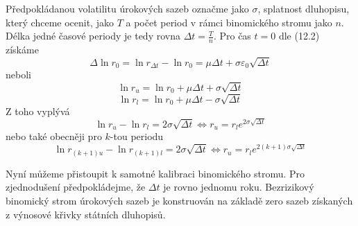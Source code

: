 \documentclass[a4paper]{book}
\begin{document}
Předpokládanou volatilitu úrokových sazeb označme jako $\sigma$, splatnost dluhopisu, který chceme ocenit, jako $T$ a počet period v rámci binomického stromu jako $n$. Délka jedné časové periody je tedy rovna $\Delta t = \frac{T}{n}$. Pro čas $t=0$ dle (12.2) získáme
\begin{equation*}
\Delta \ln r_0 = \ln r_{\Delta t} - \ln r_0 = \mu \Delta t + \sigma \varepsilon_0 \sqrt{\Delta t}
\end{equation*}
neboli
\begin{equation*}
\ln r_u = \ln r_0 + \mu \Delta t + \sigma \sqrt{\Delta t}
\end{equation*}
\begin{equation*}
\ln r_l = \ln r_0 + \mu \Delta t - \sigma \sqrt{\Delta t}
\end{equation*}
Z toho vyplývá
\begin{equation*}
\ln r_u - \ln r_l = 2 \sigma \sqrt{\Delta t} \Leftrightarrow r_u = r_l e^{2 \sigma \sqrt{\Delta t}}
\end{equation*}
nebo také obecněji pro $k$-tou periodu
\begin{equation*}
\ln r_{(k+1)u} - \ln r_{(k+1)l} = 2 \sigma \sqrt{\Delta t} \Leftrightarrow r_u = r_l e^{2(k+1) \sigma \sqrt{\Delta t}}
\end{equation*}

Nyní můžeme přistoupit k samotné kalibraci binomického stromu. Pro zjednodušení předpokládejme, že $\Delta t$ je rovno jednomu roku. Bezrizikový binomický strom úrokových sazeb je konstruován na základě zero sazeb získaných z výnosové křivky státních dluhopisů.
\end{document}
